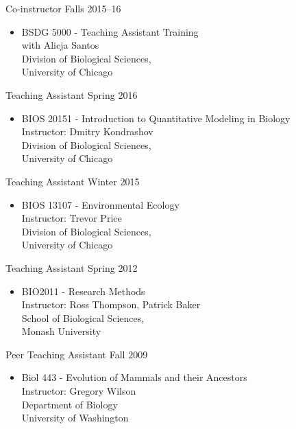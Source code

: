 \documentclass[10pt]{article}
\newenvironment{innerlist}[1][\enskip\textbullet]%
        {\begin{itemize}[#1,leftmargin=*,parsep=0pt,itemsep=0pt,topsep=0pt,partopsep=0pt]}
        {\end{itemize}}
\begin{document}
Co-instructor \hfill {Falls 2015--16}
\begin{innerlist}
\item[] BSDG 5000 - Teaching Assistant Training\\
  with Alicja Santos \\
        Division of Biological Sciences,\\
        University of Chicago 
\end{innerlist}

Teaching Assistant \hfill {Spring 2016}
\begin{innerlist}
\item[] BIOS 20151 - Introduction to Quantitative Modeling in Biology\\
  Instructor: Dmitry Kondrashov\\
        Division of Biological Sciences,\\
        University of Chicago  
\end{innerlist}

Teaching Assistant \hfill {Winter 2015}
\begin{innerlist}
\item[] BIOS 13107 - Environmental Ecology \\
  Instructor: Trevor Price\\
        Division of Biological Sciences,\\
        University of Chicago  
\end{innerlist}

Teaching Assistant \hfill {Spring 2012}
\begin{innerlist}
\item[] BIO2011 - Research Methods \\
  Instructor: Ross Thompson, Patrick Baker\\
        School of Biological Sciences,\\
        Monash University
\end{innerlist}

Peer Teaching Assistant \hfill {Fall 2009}
\begin{innerlist}
\item[] Biol 443 - Evolution of Mammals and their Ancestors \\
  Instructor: Gregory Wilson\\
        Department of Biology \\
        University of Washington
\end{innerlist}
\end{document}
